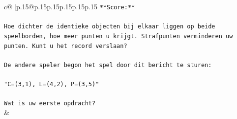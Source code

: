 \documentclass{article}
\begin{document}
{\begin{supertabular}{c@{$\;$}|p{.15\linewidth}@{}p{.15\linewidth}p{.15\linewidth}p{.15\linewidth}p{.15\linewidth}p{.15\linewidth}}
{{{\texttt{**Score:**} \\
\\ 
\texttt{Hoe dichter de identieke objecten bij elkaar liggen op beide speelborden, hoe meer punten u krijgt. Strafpunten verminderen uw punten. Kunt u het record verslaan?} \\
\\ 
\texttt{De andere speler begon het spel door dit bericht te sturen:} \\
\\ 
\texttt{"C=(3,1), L=(4,2), P=(3,5)"} \\
\\ 
\texttt{Wat is uw eerste opdracht?} \\
            }
        }
    }
    & \\ \\


\end{supertabular}}
\end{document}
